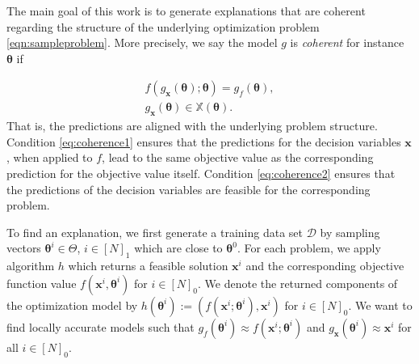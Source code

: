\documentclass{article}
\theoremstyle{plain}
\theoremstyle{definition}
\theoremstyle{remark}
\begin{document}
The main goal of this work is to generate explanations that are coherent regarding the structure of the underlying optimization problem \eqref{eqn:sampleproblem}. More precisely, we say the model $g$ is \textit{coherent} for instance $\bm{\theta}$ if 



\begin{gather}
    f(g_{\bm{x}}(\bm{\theta}); \bm{\theta}) = g_{f}(\bm{\theta}), \label{eq:coherence1}\\
    g_{\bm{x}}(\bm{\theta}) \in \mathbb X(\bm{\theta}).\label{eq:coherence2}
\end{gather}
That is, the predictions are aligned with the underlying problem structure. Condition \eqref{eq:coherence1} ensures that the predictions for the decision variables $\bm{x}$, when applied to $f$, lead to the same objective value as the corresponding prediction for the objective value itself. Condition \eqref{eq:coherence2} ensures that the predictions of the decision variables are feasible for the corresponding problem. 

To find an explanation, we first generate a training data set $\mathcal{D}$ by sampling vectors $\bm{\theta}^i\in\Theta$, $i\in [N]_1$ which are close to $\bm{\theta}^0$. For each problem, we apply algorithm $h$ which returns a feasible solution $\bm{x}^i$ and the corresponding objective function value $f(\bm{x}^i,\bm{\theta}^i)$ for $i\in [N]_0$. We denote the returned components of the optimization model by $h(\bm{\theta}^i) := (f(\bm{x}^i;\bm{\theta}^i), \bm{x}^i)$ for $i \in [N]_0$. We want to find locally accurate models such that $g_{f}(\bm{\theta}^i) \approx f(\bm{x}^i; \bm{\theta}^i)$ and $g_{\bm x}(\bm{\theta}^i) \approx \bm{x}^i$ for all $i\in[N]_0$.
\end{document}

